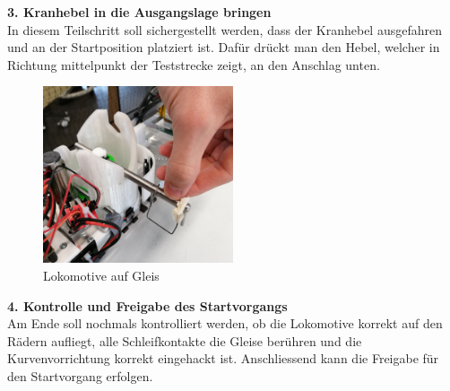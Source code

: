 \documentclass[../../main.tex]{subfiles}
\begin{document}
\newpage

\textbf{3. Kranhebel in die Ausgangslage bringen}\\
In diesem Teilschritt soll sichergestellt werden, dass der Kranhebel ausgefahren und an der Startposition platziert ist. Dafür drückt man den Hebel, welcher in Richtung mittelpunkt der Teststrecke zeigt, an den Anschlag unten.\\

\begin{figure}[H]
  \centering
  \includegraphics[width=0.5\textwidth]{montagekran.PNG}
  \caption {Lokomotive auf Gleis}
  \label{fig:montagezug}
\end{figure}

\textbf{4. Kontrolle und Freigabe des Startvorgangs}\\
Am Ende soll nochmals kontrolliert werden, ob die Lokomotive korrekt auf den Rädern aufliegt, alle Schleifkontakte die Gleise berühren und die Kurvenvorrichtung korrekt eingehackt ist. Anschliessend kann die Freigabe für den Startvorgang erfolgen.
\end{document}
